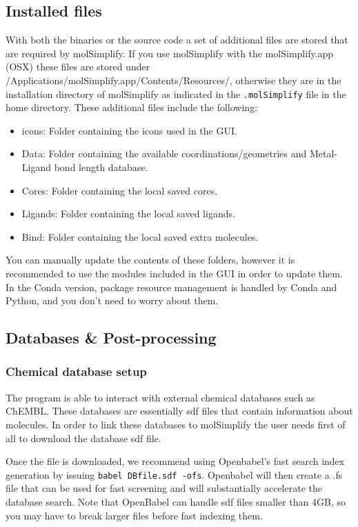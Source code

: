 \subsection{Installed files}

With both the binaries or the source code a set of additional files are stored that are required by molSimplify. If you use molSimplify with the molSimplify.app (OSX) these files are stored under /Applications/molSimplify.app/Contents/Resources/, otherwise they are in the installation directory of molSimplify as indicated in the \texttt{.molSimplify} file in the home directory. These additional files include the following:
\begin{itemize}
\item icons: Folder containing the icons used in the GUI.
\item Data: Folder containing the available coordinations/geometries and Metal-Ligand bond length database.
\item Cores: Folder containing the local saved cores.
\item Ligands: Folder containing the local saved ligands.
\item Bind: Folder containing the local saved extra molecules.
\end{itemize}

You can manually update the contents of these folders, however it is recommended to use the modules included in the GUI in order to update them. \\

In the Conda version, package resource management is handled by Conda and Python, and you don't need to worry about them.

\subsection{Databases \& Post-processing}\label{dbpp}

\subsubsection{Chemical database setup}


The program is able to interact with external chemical databases such as ChEMBL. These databases are essentially sdf files that contain information about molecules. In order to link these databases to molSimplify the user needs first of all to download the database sdf file. 

Once the file is downloaded, we recommend using Openbabel's fast search index generation by issuing  \texttt{babel DBfile.sdf -ofs}. Openbabel will then create a .fs file that can be used for fast screening and will substantially accelerate the database search. Note that OpenBabel can handle sdf files smaller than 4GB, so you may have to break larger files before fast indexing them. 

